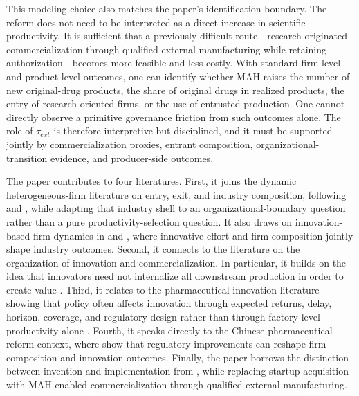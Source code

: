 This modeling choice also matches the paper's identification boundary. The reform does not need to be interpreted as a direct increase in scientific productivity. It is sufficient that a previously difficult route---research-originated commercialization through qualified external manufacturing while retaining authorization---becomes more feasible and less costly. With standard firm-level and product-level outcomes, one can identify whether MAH raises the number of new original-drug products, the share of original drugs in realized products, the entry of research-oriented firms, or the use of entrusted production. One cannot directly observe a primitive governance friction from such outcomes alone. The role of $\tau_{ext}$ is therefore interpretive but disciplined, and it must be supported jointly by commercialization proxies, entrant composition, organizational-transition evidence, and producer-side outcomes.

The paper contributes to four literatures. First, it joins the dynamic heterogeneous-firm literature on entry, exit, and industry composition, following \citet{Hopenhayn1992} and \citet{EricsonPakes1995}, while adapting that industry shell to an organizational-boundary question rather than a pure productivity-selection question. It also draws on innovation-based firm dynamics in \citet{KletteKortum2004} and \citet{AkcigitKerr2018}, where innovative effort and firm composition jointly shape industry outcomes. Second, it connects to the literature on the organization of innovation and commercialization. In particular, it builds on the idea that innovators need not internalize all downstream production in order to create value \citep{AroraFosfuriGambardella2001,AroraMerges2004,GansStern2000,GansStern2003}. Third, it relates to the pharmaceutical innovation literature showing that policy often affects innovation through expected returns, delay, horizon, coverage, and regulatory design rather than through factory-level productivity alone \citep{AcemogluLinn2004,Lakdawalla2018}. Fourth, it speaks directly to the Chinese pharmaceutical reform context, where \citet{JiaMaYangZhang2023} show that regulatory improvements can reshape firm composition and innovation outcomes. Finally, the paper borrows the distinction between invention and implementation from \citet{FonsRosenRoldanBlancoSchmitz2024}, while replacing startup acquisition with MAH-enabled commercialization through qualified external manufacturing.


